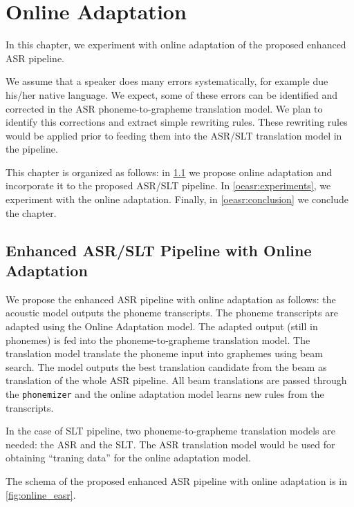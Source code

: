 \chapter{Online Adaptation}
\label{chap:adaptation}
In this chapter, we experiment with online adaptation of the proposed enhanced ASR pipeline.

We assume that a speaker does many errors systematically, for example due his/her native language. We expect, some of these errors can be identified and corrected in the ASR phoneme-to-grapheme translation model. We plan to identify this corrections and extract simple rewriting rules. These rewriting rules would be applied prior to feeding them into the ASR/SLT translation model in the pipeline.

This chapter is organized as follows: in \cref{oeasr:model} we propose online adaptation and incorporate it to the proposed ASR/SLT pipeline. In \cref{oeasr:experiments}, we experiment with the online adaptation. Finally, in \cref{oeasr:conclusion} we conclude the chapter.

\section{Enhanced ASR/SLT Pipeline with Online Adaptation}
\label{oeasr:model}
We propose the enhanced ASR pipeline with online adaptation as follows: the acoustic model outputs the phoneme transcripts. The phoneme transcripts are adapted using the Online Adaptation model. The adapted output (still in phonemes) is fed into the phoneme-to-grapheme translation model. The translation model translate the phoneme input into graphemes using beam search. The model outputs the best translation candidate from the beam as translation of the whole ASR pipeline. All beam translations are passed through the \texttt{phonemizer} and the online adaptation model learns new rules from the transcripts.

In the case of SLT pipeline, two phoneme-to-grapheme translation models are needed: the ASR and the SLT. The ASR translation model would be used for obtaining ``traning data'' for the online adaptation model.

The schema of the proposed enhanced ASR pipeline with online adaptation is in \cref{fig:online_easr}.

